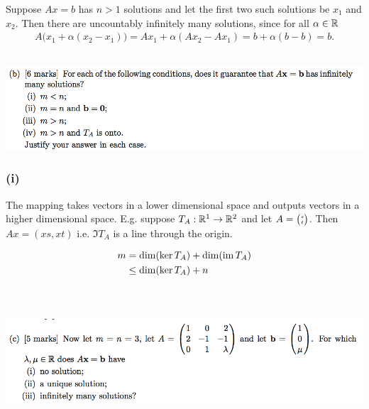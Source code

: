 \documentclass[12pt]{article}
\begin{document}
Suppose $Ax = b$ has $n > 1$ solutions and let the first two such solutions be
$x_1$ and $x_2$. Then there are uncountably infinitely many solutions, since
for all $\alpha \in \mathbb{R}$
\begin{align*}
A\Big(x_1 + \alpha (x_2 - x_1)\Big) = Ax_1 + \alpha(Ax_2 - Ax_1) = b + \alpha(b - b) = b.
\end{align*}

\subsection*{} %
\begin{mdframed}
\includegraphics[width=400pt]{img/oxford-prelims-2017-A-2-2.png}
\end{mdframed}

\subsubsection*{(i)} The mapping takes vectors in a lower dimensional space and
outputs vectors in a higher dimensional space. E.g. suppose $T_A:\mathbb{R}^1 \to \mathbb{R}^2$
and let $A = \tiny{\begin{pmatrix}s\\t\end{pmatrix}}$. Then $Ax = (xs, xt)$ i.e. $\Im T_A$ is a line
through the origin.

\begin{align*}
  m &=    \dim(\ker T_A) + \dim(\operatorname{\text{im}} T_A)\\
    &\leq \dim(\ker T_A) + n\\
\end{align*}
~\\
\subsection*{} %
\begin{mdframed}
\includegraphics[width=400pt]{img/oxford-prelims-2017-A-2-3.png}
\end{mdframed}
\end{document}
